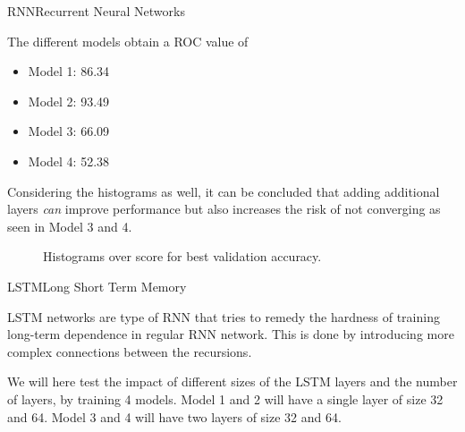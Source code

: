\documentclass{beamer}
\newlength\figureheight
\newlength\figurewidth
\begin{document}
\begin{frame}{RNN}{Recurrent Neural Networks}
	
	\noindent
	\begin{minipage}{0.45\textwidth}%
		 The different models obtain a ROC value of 
		 \begin{itemize}%
		 	\item Model 1: 86.34
		 	\item Model 2: 93.49
		 	\item Model 3: 66.09
		 	\item Model 4: 52.38
		 \end{itemize}
	 	Considering the histograms as well, it can be concluded that adding additional layers \emph{can} improve performance but also increases the risk of not converging as seen in Model 3 and 4.
	\end{minipage} \hfill
	\begin{minipage}{0.45\textwidth}%
		\begin{figure}
			\centering
			
			\setlength\figureheight{3cm}
			\setlength{}
			
			
			\caption{Histograms over score for best validation accuracy.} 
		\end{figure}
	\end{minipage}
\end{frame}


\begin{frame}{LSTM}{Long Short Term Memory}

LSTM networks are type of RNN that tries to remedy the hardness of training long-term dependence in regular RNN network. This is done by introducing more complex connections between the recursions. 

We will here test the impact of different sizes of the LSTM layers and the number of layers, by training 4 models. Model 1 and 2 will have a single layer of size 32 and 64. Model 3 and 4 will have two layers of size 32 and 64. 
  
\end{frame}
\end{document}
